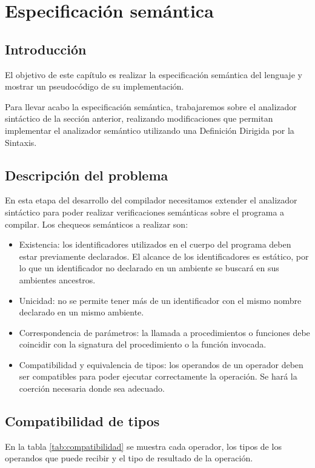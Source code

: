 \chapter{Especificación semántica}
\section{Introducción}
El objetivo de este capítulo es realizar la especificación semántica del lenguaje y mostrar un pseudocódigo de su implementación.

Para llevar acabo la especificación semántica, trabajaremos sobre el analizador sintáctico de la sección anterior, realizando modificaciones que permitan implementar el analizador semántico utilizando una Definición Dirigida por la Sintaxis.

\section{Descripción del problema}
\label{sec:sem:descr_probl}
En esta etapa del desarrollo del compilador necesitamos extender el analizador sintáctico para poder realizar verificaciones semánticas sobre el programa a compilar. Los chequeos semánticos a realizar son:
\begin{itemize}
\item Existencia: los identificadores utilizados en el cuerpo del programa deben estar previamente declarados. El alcance de los identificadores es estático, por lo que un identificador no declarado en un ambiente se buscará en sus ambientes ancestros.
\item Unicidad: no se permite tener más de un identificador con el mismo nombre declarado en un mismo ambiente.
\item Correspondencia de parámetros: la llamada a procedimientos o funciones debe coincidir con la signatura del procedimiento o la función invocada.
\item Compatibilidad y equivalencia de tipos: los operandos de un operador deben ser compatibles para poder ejecutar correctamente la operación. Se hará la coerción necesaria donde sea adecuado.
\end{itemize}

\section{Compatibilidad de tipos}
En la tabla \ref{tab:compatibilidad} se muestra cada operador, los tipos de los operandos que puede recibir y el tipo de resultado de la operación.

